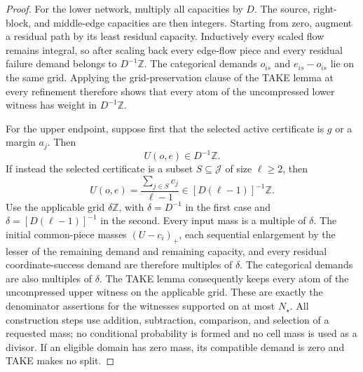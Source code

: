 \documentclass{article}
\begin{document}
\begin{proof}
For the lower network, multiply all capacities by \(D\).  The source, right-block, and middle-edge capacities are then integers.  Starting from zero, augment a residual path by its least residual capacity.  Inductively every scaled flow remains integral, so after scaling back every edge-flow piece and every residual failure demand belongs to \(D^{-1}\mathbb Z\).  The categorical demands \(o_{is}\) and \(e_{is}-o_{is}\) lie on the same grid.  Applying the grid-preservation clause of the TAKE lemma at every refinement therefore shows that every atom of the uncompressed lower witness has weight in \(D^{-1}\mathbb Z\).

For the upper endpoint, suppose first that the selected active certificate is \(g\) or a margin \(a_j\).  Then
\[
U(o,e)\in D^{-1}\mathbb Z.
\]
If instead the selected certificate is a subset \(S\subseteq\mathcal J\) of size \(\ell\geq2\), then
\[
U(o,e)=\frac{\sum_{j\in S}c_j}{\ell-1}
\in [D(\ell-1)]^{-1}\mathbb Z.
\]
Use the applicable grid \(\delta\mathbb Z\), with \(\delta=D^{-1}\) in the first case and \(\delta=[D(\ell-1)]^{-1}\) in the second.  Every input mass is a multiple of \(\delta\).  The initial common-piece masses \((U-c_i)_+\), each sequential enlargement by the lesser of the remaining demand and remaining capacity, and every residual coordinate-success demand are therefore multiples of \(\delta\).  The categorical demands are also multiples of \(\delta\).  The TAKE lemma consequently keeps every atom of the uncompressed upper witness on the applicable grid.  These are exactly the denominator assertions for the witnesses supported on at most \(N_\star\).  All construction steps use addition, subtraction, comparison, and selection of a requested mass; no conditional probability is formed and no cell mass is used as a divisor.  If an eligible domain has zero mass, its compatible demand is zero and TAKE makes no split.


\end{proof}
\end{document}
